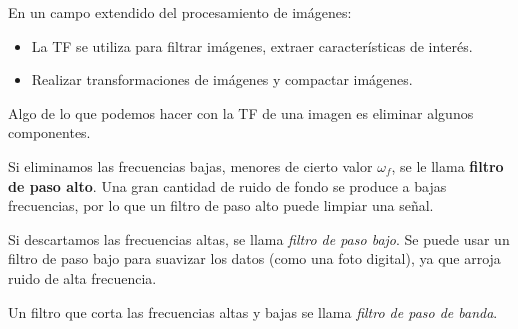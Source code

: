 En un campo extendido del procesamiento de imágenes:
\begin{itemize}
\item La TF se utiliza para filtrar imágenes, extraer características de interés.
\item Realizar transformaciones de imágenes y compactar imágenes.
\end{itemize}

Algo de lo que podemos hacer con la TF de una imagen es eliminar algunos componentes.
\par
Si eliminamos las frecuencias bajas, menores de cierto valor $\omega_{f}$, se le llama \textbf{filtro de paso alto}.  Una gran cantidad de ruido de fondo se produce a bajas frecuencias, por lo que un filtro de paso alto puede limpiar una señal.
\par
Si descartamos las frecuencias altas, se llama \emph{filtro de paso bajo}. Se puede usar un filtro de paso bajo para suavizar los datos (como una foto digital), ya que arroja ruido de alta frecuencia.
\par
Un filtro que corta las frecuencias altas y bajas se llama \emph{filtro de paso de banda}.

